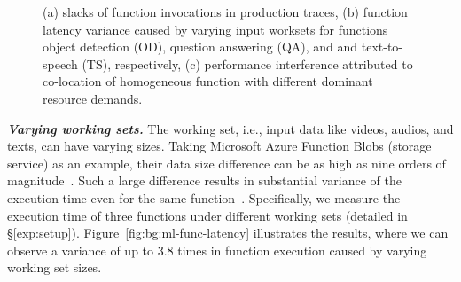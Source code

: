 \begin{figure*}[!t]
	\centering
	\subfloat[]{
		\texttt{[image: ./figure/motivation/Average\_P99\_cdf\_top=100.pdf]}
		\label{fig:bg:slack}
	}
	\hspace{8mm}
	\hspace{8mm}
	\caption{(a) slacks of function invocations in production traces, (b) function latency variance caused by varying input worksets for functions object detection (OD), question answering (QA), and and text-to-speech (TS), respectively,
 (c) performance interference attributed to co-location of homogeneous function with different dominant resource demands.}
\end{figure*}

\textbf{\textit{Varying working sets.}} 
The working set, i.e., input data like videos, audios, and texts, can have varying sizes.
Taking Microsoft Azure Function Blobs (storage service) as an example, their data size difference can be as high as nine orders of magnitude~\cite{azure-function-blob}.
Such a large difference results in substantial variance of the execution time even for the same function~\cite{socc21-faast,eurosys21-ofc}.
Specifically, we measure the execution time of three functions under different working sets (detailed in \S\ref{exp:setup}).
Figure~\ref{fig:bg:ml-func-latency} illustrates the results, where we can observe a variance of up to 3.8 times in function execution caused by varying working set sizes.


